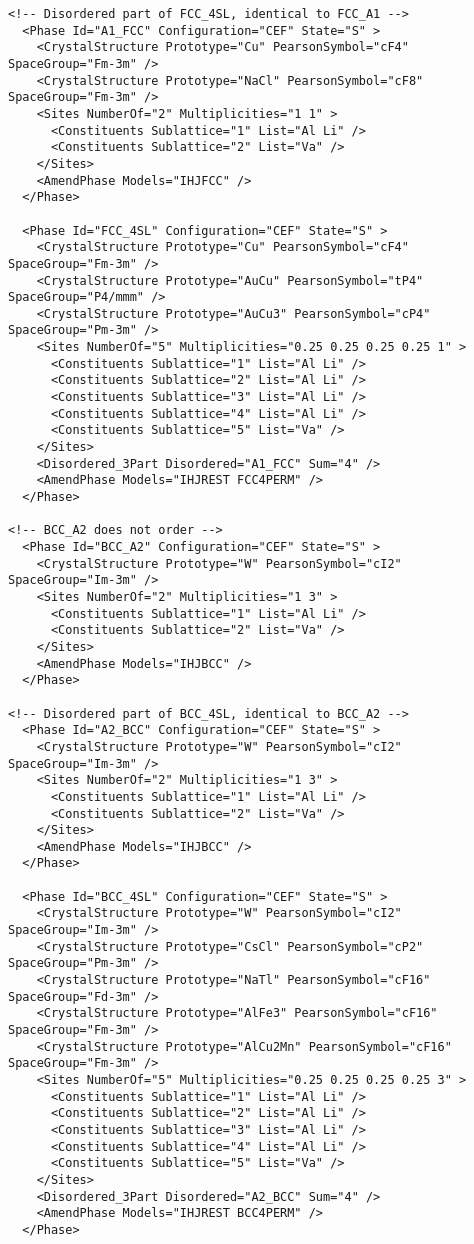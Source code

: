 \documentclass{article}
\begin{document}
\begin{appendices}
\begin{verbatim}
<!-- Disordered part of FCC_4SL, identical to FCC_A1 -->
  <Phase Id="A1_FCC" Configuration="CEF" State="S" >
	<CrystalStructure Prototype="Cu" PearsonSymbol="cF4" SpaceGroup="Fm-3m" />
	<CrystalStructure Prototype="NaCl" PearsonSymbol="cF8" SpaceGroup="Fm-3m" />
    <Sites NumberOf="2" Multiplicities="1 1" >
      <Constituents Sublattice="1" List="Al Li" />
      <Constituents Sublattice="2" List="Va" />
    </Sites>
    <AmendPhase Models="IHJFCC" />
  </Phase>

  <Phase Id="FCC_4SL" Configuration="CEF" State="S" >
	<CrystalStructure Prototype="Cu" PearsonSymbol="cF4" SpaceGroup="Fm-3m" />
	<CrystalStructure Prototype="AuCu" PearsonSymbol="tP4" SpaceGroup="P4/mmm" />
	<CrystalStructure Prototype="AuCu3" PearsonSymbol="cP4" SpaceGroup="Pm-3m" />
    <Sites NumberOf="5" Multiplicities="0.25 0.25 0.25 0.25 1" >
      <Constituents Sublattice="1" List="Al Li" />
      <Constituents Sublattice="2" List="Al Li" />
      <Constituents Sublattice="3" List="Al Li" />
      <Constituents Sublattice="4" List="Al Li" />
      <Constituents Sublattice="5" List="Va" />
    </Sites>
    <Disordered_3Part Disordered="A1_FCC" Sum="4" />
    <AmendPhase Models="IHJREST FCC4PERM" />
  </Phase>

<!-- BCC_A2 does not order -->
  <Phase Id="BCC_A2" Configuration="CEF" State="S" >
	<CrystalStructure Prototype="W" PearsonSymbol="cI2" SpaceGroup="Im-3m" />
    <Sites NumberOf="2" Multiplicities="1 3" >
      <Constituents Sublattice="1" List="Al Li" />
      <Constituents Sublattice="2" List="Va" />
    </Sites>
    <AmendPhase Models="IHJBCC" />
  </Phase>

<!-- Disordered part of BCC_4SL, identical to BCC_A2 -->
  <Phase Id="A2_BCC" Configuration="CEF" State="S" >
	<CrystalStructure Prototype="W" PearsonSymbol="cI2" SpaceGroup="Im-3m" />
    <Sites NumberOf="2" Multiplicities="1 3" >
      <Constituents Sublattice="1" List="Al Li" />
      <Constituents Sublattice="2" List="Va" />
    </Sites>
    <AmendPhase Models="IHJBCC" />
  </Phase>

  <Phase Id="BCC_4SL" Configuration="CEF" State="S" >
	<CrystalStructure Prototype="W" PearsonSymbol="cI2" SpaceGroup="Im-3m" />
	<CrystalStructure Prototype="CsCl" PearsonSymbol="cP2" SpaceGroup="Pm-3m" />
	<CrystalStructure Prototype="NaTl" PearsonSymbol="cF16" SpaceGroup="Fd-3m" />
	<CrystalStructure Prototype="AlFe3" PearsonSymbol="cF16" SpaceGroup="Fm-3m" />
	<CrystalStructure Prototype="AlCu2Mn" PearsonSymbol="cF16" SpaceGroup="Fm-3m" />
    <Sites NumberOf="5" Multiplicities="0.25 0.25 0.25 0.25 3" >
      <Constituents Sublattice="1" List="Al Li" />
      <Constituents Sublattice="2" List="Al Li" />
      <Constituents Sublattice="3" List="Al Li" />
      <Constituents Sublattice="4" List="Al Li" />
      <Constituents Sublattice="5" List="Va" />
    </Sites>
    <Disordered_3Part Disordered="A2_BCC" Sum="4" />
    <AmendPhase Models="IHJREST BCC4PERM" />
  </Phase>


\end{verbatim}
\end{appendices}
\end{document}
